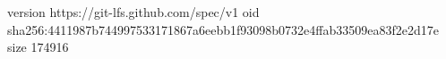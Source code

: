 version https://git-lfs.github.com/spec/v1
oid sha256:4411987b744997533171867a6eebb1f93098b0732e4ffab33509ea83f2e2d17e
size 174916
